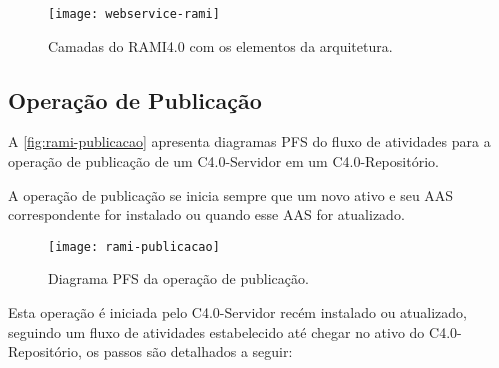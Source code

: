 	\begin{figure}[H]
		\centering
		\caption{Camadas do RAMI4.0 com os elementos da arquitetura.}
		\label{fig:webservice-rami}
		\texttt{[image: webservice-rami]}
	\end{figure}

\subsection{Operação de Publicação}

	A \autoref{fig:rami-publicacao} apresenta diagramas PFS do fluxo de atividades para a operação de publicação de um C4.0-Servidor em um C4.0-Repositório.
	
	A operação de publicação se inicia sempre que um novo ativo e seu AAS correspondente for instalado ou quando esse AAS for atualizado.
	
	\begin{figure}[htb]
		\centering
		\caption{Diagrama PFS da operação de publicação.}
		\label{fig:rami-publicacao}
		\texttt{[image: rami-publicacao]}
	\end{figure}

	Esta operação é iniciada pelo C4.0-Servidor recém instalado ou atualizado, seguindo um fluxo de atividades estabelecido até chegar no ativo do C4.0-Repositório, os passos são detalhados a seguir:
	
